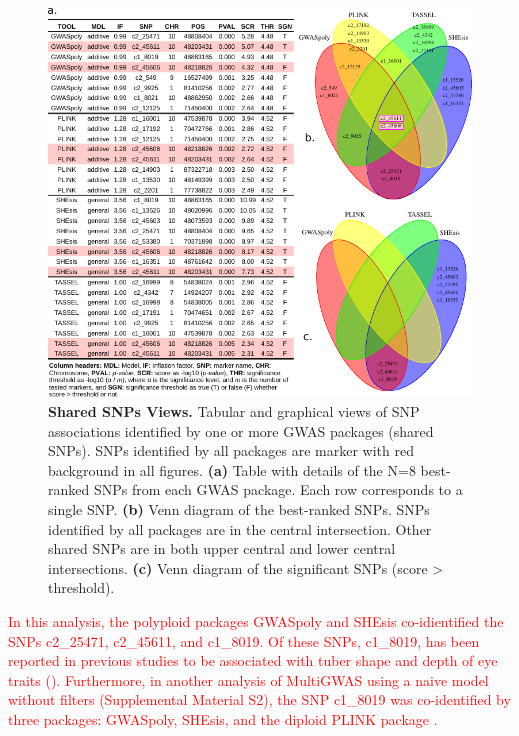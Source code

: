 \documentclass{article}
\begin{document}
\begin{figure}[H]
\begin{centering}
\includegraphics{images/paper-table-venn-best} 
\par\end{centering}
\caption{\textbf{Shared SNPs Views.} Tabular and graphical views of SNP associations identified by one or more GWAS packages (shared SNPs). SNPs identified by all packages are marker with red background in all figures. \textbf{(a)} Table with details of the N=8 best-ranked SNPs from each GWAS package. Each row corresponds to a single SNP. \textbf{(b)} Venn diagram of the best-ranked SNPs. SNPs identified by all packages are in the central intersection. Other shared SNPs are in both upper central and lower central intersections. \textbf{(c)} Venn diagram of the significant SNPs (score \textgreater{} threshold). \label{fig:Table-Shared-SNPs}}
\end{figure}

\textcolor{red}{In this analysis, the polyploid packages GWASpoly and SHEsis co-idientified the SNPs c2\_25471, c2\_45611, and c1\_8019. Of these SNPs, c1\_8019, has been reported in previous studies to be associated with tuber shape and depth of eye traits (\cite{Rosyara2016,Sharma2018}). Furthermore, in another analysis of MultiGWAS using a naive model without filters (Supplemental Material S2), the SNP c1\_8019 was co-identified by three packages: GWASpoly, SHEsis, and the diploid PLINK package .}
\end{document}
